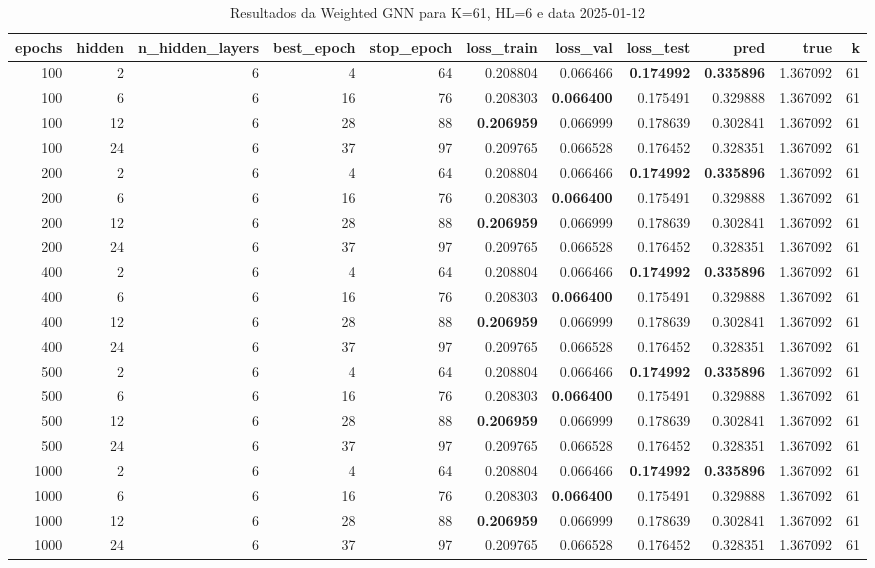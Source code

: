 \begin{table}
\caption{Resultados da Weighted GNN para K=61, HL=6 e data 2025-01-12}
\label{tab:weighted_gnn_results_k61_hl6_d20250112}
\begin{tabular}{rrrrrrrrrrr}
\toprule
epochs & hidden & n\_hidden\_layers & best\_epoch & stop\_epoch & loss\_train & loss\_val & loss\_test & pred & true & k \\
\midrule
100 & 2 & 6 & 4 & 64 & 0.208804 & 0.066466 & \textbf{0.174992} & \textbf{0.335896} & 1.367092 & 61 \\
100 & 6 & 6 & 16 & 76 & 0.208303 & \textbf{0.066400} & 0.175491 & 0.329888 & 1.367092 & 61 \\
100 & 12 & 6 & 28 & 88 & \textbf{0.206959} & 0.066999 & 0.178639 & 0.302841 & 1.367092 & 61 \\
100 & 24 & 6 & 37 & 97 & 0.209765 & 0.066528 & 0.176452 & 0.328351 & 1.367092 & 61 \\
200 & 2 & 6 & 4 & 64 & 0.208804 & 0.066466 & \textbf{0.174992} & \textbf{0.335896} & 1.367092 & 61 \\
200 & 6 & 6 & 16 & 76 & 0.208303 & \textbf{0.066400} & 0.175491 & 0.329888 & 1.367092 & 61 \\
200 & 12 & 6 & 28 & 88 & \textbf{0.206959} & 0.066999 & 0.178639 & 0.302841 & 1.367092 & 61 \\
200 & 24 & 6 & 37 & 97 & 0.209765 & 0.066528 & 0.176452 & 0.328351 & 1.367092 & 61 \\
400 & 2 & 6 & 4 & 64 & 0.208804 & 0.066466 & \textbf{0.174992} & \textbf{0.335896} & 1.367092 & 61 \\
400 & 6 & 6 & 16 & 76 & 0.208303 & \textbf{0.066400} & 0.175491 & 0.329888 & 1.367092 & 61 \\
400 & 12 & 6 & 28 & 88 & \textbf{0.206959} & 0.066999 & 0.178639 & 0.302841 & 1.367092 & 61 \\
400 & 24 & 6 & 37 & 97 & 0.209765 & 0.066528 & 0.176452 & 0.328351 & 1.367092 & 61 \\
500 & 2 & 6 & 4 & 64 & 0.208804 & 0.066466 & \textbf{0.174992} & \textbf{0.335896} & 1.367092 & 61 \\
500 & 6 & 6 & 16 & 76 & 0.208303 & \textbf{0.066400} & 0.175491 & 0.329888 & 1.367092 & 61 \\
500 & 12 & 6 & 28 & 88 & \textbf{0.206959} & 0.066999 & 0.178639 & 0.302841 & 1.367092 & 61 \\
500 & 24 & 6 & 37 & 97 & 0.209765 & 0.066528 & 0.176452 & 0.328351 & 1.367092 & 61 \\
1000 & 2 & 6 & 4 & 64 & 0.208804 & 0.066466 & \textbf{0.174992} & \textbf{0.335896} & 1.367092 & 61 \\
1000 & 6 & 6 & 16 & 76 & 0.208303 & \textbf{0.066400} & 0.175491 & 0.329888 & 1.367092 & 61 \\
1000 & 12 & 6 & 28 & 88 & \textbf{0.206959} & 0.066999 & 0.178639 & 0.302841 & 1.367092 & 61 \\
1000 & 24 & 6 & 37 & 97 & 0.209765 & 0.066528 & 0.176452 & 0.328351 & 1.367092 & 61 \\
\bottomrule
\end{tabular}
\end{table}

